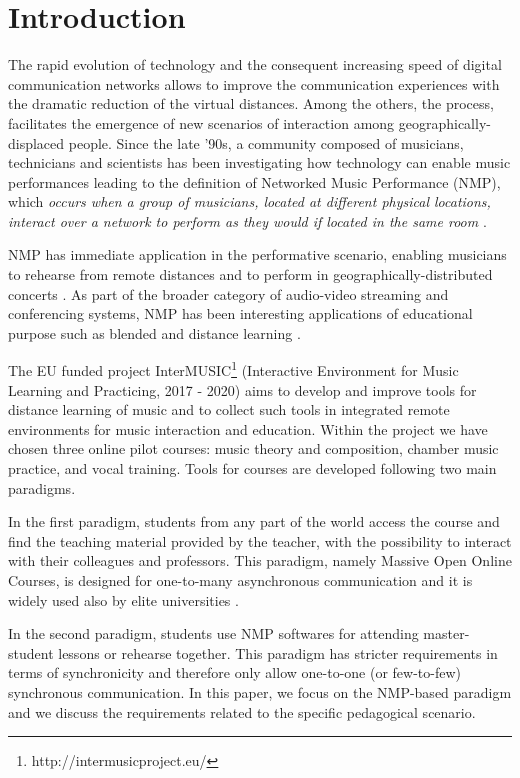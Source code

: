 
\section{Introduction}\label{sec:introduction}

The rapid evolution of technology and the consequent increasing speed of digital communication networks allows to improve the communication experiences with the dramatic reduction of the virtual distances. Among the others, the process, facilitates the emergence of new scenarios of interaction among geogra\-phically-displaced people. Since the late '90s, a community composed of musicians, technicians and  scientists has been investigating how technology can enable music performances leading to the definition of Networked Music Performance (NMP), which \textit{occurs when a group of musicians, located at different physical locations, interact over a network to perform as they would if located in the same room} \cite{Lazzaro2001}.

NMP has immediate application in the performative scenario, enabling musicians to rehearse from remote distances and to perform in geographically-distributed concerts \cite{barbosa2003displaced}. As part of the broader category of audio-video streaming and conferencing systems, NMP has been interesting applications of educational purpose such as blended and distance learning \cite{IorwerthNMP2015}.    


The EU funded project InterMUSIC\footnote{http://intermusicproject.eu/} (Interactive Environment for Music Learning and Practicing, 2017 - 2020) aims to develop and improve tools for distance learning of music and to collect such tools in integrated remote environments for music interaction and education. Within the project we have chosen three online pilot courses: music theory and composition, chamber music practice, and vocal training. Tools for courses are developed following two main paradigms. %

In the first paradigm, students from any part of the world access the course and find the teaching material provided by the teacher, with the possibility to interact with their colleagues and professors. This paradigm, namely Massive Open Online Courses, is designed for one-to-many asynchronous communication and it is widely used also by elite universities \cite{MOOCS}.

In the second paradigm, students use NMP softwares for attending master-student lessons or rehearse together. This paradigm has stricter requirements in terms of synchronicity and therefore only allow one-to-one (or few-to-few) synchronous communication. In this paper, we focus on the NMP-based paradigm and we discuss the  requirements related to the specific pedagogical scenario.

